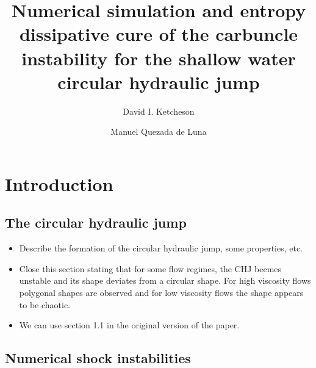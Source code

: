 \documentclass[preprint, 11pt]{article}
\title{Numerical simulation and entropy dissipative cure of the 
  carbuncle instability for the shallow water circular hydraulic jump}
\author{
    David I. Ketcheson \and
    Manuel Quezada de Luna
}
\begin{document}
\maketitle

\begin{abstract}

\end{abstract}

\section{Introduction}

\subsection{The circular hydraulic jump}

\begin{itemize}
  \item Describe the formation of the circular hydraulic jump, some properties, etc. 
  \item Close this section stating that for some flow regimes, the CHJ becmes unstable and its 
    shape deviates from a circular shape. For high viscosity flows polygonal shapes are observed 
    and for low viscosity flows the shape appears to be chaotic. 
  \item We can use section 1.1 in the original version of the paper.
\end{itemize}

\subsection{Numerical shock instabilities}
\end{document}
